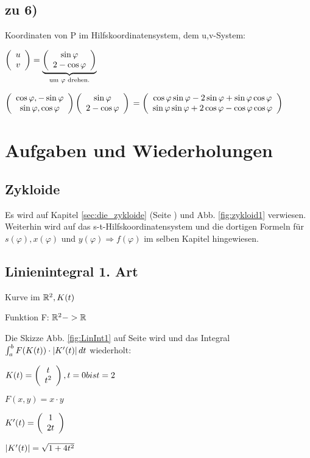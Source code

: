 \subsection{zu 6)}
Koordinaten von P im Hilfskoordinatensystem, dem u,v-System: 

$   \left(  \begin{array}{c} u\\v \end{array}  \right)   = \underbrace{  \left(  \begin{array}{c} \sin \varphi\\2 - \cos \varphi \end{array}  \right)  }_{\textrm{um } \varphi \textrm{ drehen.}} $

$   \left(  \begin{array}{c} \cos \varphi, -\sin \varphi\\\sin \varphi, \cos \varphi \end{array}  \right)     \left(  \begin{array}{c} \sin \varphi\\2-\cos \varphi \end{array}  \right)   $
$=  \left(  \begin{array}{c} \cos \varphi \sin \varphi - 2 \sin \varphi + \sin \varphi \cos \varphi\\\sin \varphi \sin \varphi + 2 \cos \varphi - \cos \varphi \cos \varphi  \end{array}  \right)   $

\section{Aufgaben und Wiederholungen}

\subsection{Zykloide}
Es wird auf Kapitel \ref{sec:die_zykloide} (Seite \pageref{sec:die_zykloide}) und Abb. \ref{fig:zykloid1} verwiesen. Weiterhin wird auf das s-t-Hilfskoordinatensystem und die dortigen Formeln für $ s(\varphi), x(\varphi) $ und $ y(\varphi) \Rightarrow f(\varphi) $ im selben Kapitel hingewiesen. 

\subsection{Linienintegral 1. Art}
Kurve im $\mathbb{R}^2, K(t)$

Funktion F: $\mathbb{R}^2 -> \mathbb{R}$

Die Skizze Abb. \ref{fig:LinInt1} auf Seite \pageref{fig:LinInt1} wird und das Integral $\int_{a}^{b} F(K(t)) \cdot  \left\vert K'(t) \right\vert  dt$ wiederholt:

$ K(t) =   \left(  \begin{array}{c} t\\t^2 \end{array}  \right)  , t=0 bis t = 2 $

$ F(x,y) = x\cdot y $

$ K'(t) =   \left(  \begin{array}{c} 1\\2t \end{array}  \right)   $

$  \left\vert K'(t) \right\vert  = \sqrt{1 + 4 t^2} $


